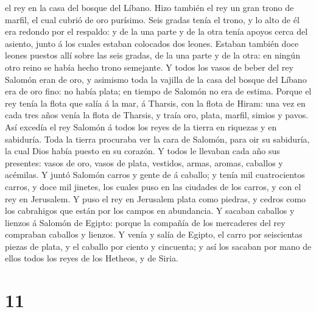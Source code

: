 el rey en la casa del bosque del Líbano.  Hizo también el
rey un gran trono de marfil, el cual cubrió de oro purísimo.
 Seis gradas tenía el trono, y lo alto de él era redondo
por el respaldo: y de la una parte y de la otra tenía apoyos cerca del
asiento, junto á los cuales estaban colocados dos leones.
 Estaban también doce leones puestos allí sobre las seis
gradas, de la una parte y de la otra: en ningún otro reino se había
hecho trono semejante.  Y todos los vasos de beber del
rey Salomón eran de oro, y asimismo toda la vajilla de la casa del
bosque del Líbano era de oro fino: no había plata; en tiempo de Salomón
no era de estima.  Porque el rey tenía la flota que salía
á la mar, á Tharsis, con la flota de Hiram: una vez en cada tres años
venía la flota de Tharsis, y traía oro, plata, marfil, simios y pavos.
 Así excedía el rey Salomón á todos los reyes de la
tierra en riquezas y en sabiduría.  Toda la tierra
procuraba ver la cara de Salomón, para oir su sabiduría, la cual Dios
había puesto en su corazón.  Y todos le llevaban cada año
sus presentes: vasos de oro, vasos de plata, vestidos, armas, aromas,
caballos y acémilas.  Y juntó Salomón carros y gente de á
caballo; y tenía mil cuatrocientos carros, y doce mil jinetes, los
cuales puso en las ciudades de los carros, y con el rey en Jerusalem.
 Y puso el rey en Jerusalem plata como piedras, y cedros
como los cabrahigos que están por los campos en abundancia.
 Y sacaban caballos y lienzos á Salomón de Egipto: porque
la compañía de los mercaderes del rey compraban caballos y lienzos.
 Y venía y salía de Egipto, el carro por seiscientas
piezas de plata, y el caballo por ciento y cincuenta; y así los sacaban
por mano de ellos todos los reyes de los Hetheos, y de Siria.

\hypertarget{section-10}{%
\section{11}\label{section-10}}

